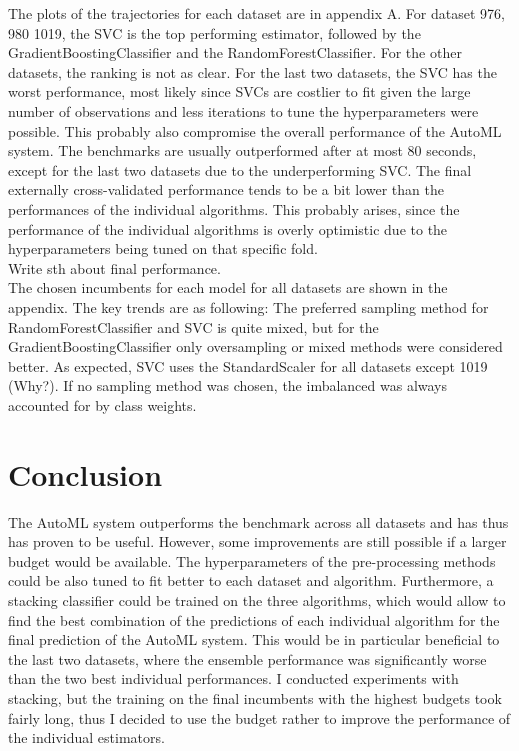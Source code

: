 \documentclass[11pt]{article}
\begin{document}
The plots of the trajectories for each dataset are in appendix A. For dataset 976, 980 1019, the SVC is the top performing estimator, followed by the GradientBoostingClassifier and the RandomForestClassifier. For the other datasets, the ranking is not as clear. For the last two datasets, the SVC has the worst performance, most likely since SVCs are costlier to fit given the large number of observations and less iterations to tune the hyperparameters were possible. This probably also compromise the overall performance of the AutoML system. The benchmarks are usually outperformed after at most 80 seconds, except for the last two datasets due to the underperforming SVC. The final externally cross-validated performance tends to be a bit lower than the performances of the individual algorithms. This probably arises, since the performance of the individual algorithms is overly optimistic due to the hyperparameters being tuned on that specific fold. \\

Write sth about final performance. \\

The chosen incumbents for each model for all datasets are shown in the appendix. The key trends are as following: The preferred sampling method for RandomForestClassifier and SVC is quite mixed, but for the GradientBoostingClassifier only oversampling or mixed methods were considered better. As expected, SVC uses the StandardScaler for all datasets except 1019 (Why?). If no sampling method was chosen, the imbalanced was always accounted for by class weights. \\

\section{Conclusion}

The AutoML system outperforms the benchmark across all datasets and has thus has proven to be useful. However, some improvements are still possible if a larger budget would be available. The hyperparameters of the pre-processing methods could be also tuned to fit better to each dataset and algorithm. Furthermore, a stacking classifier could be trained on the three algorithms, which would allow to find the best combination of the predictions of each individual algorithm for the final prediction of the AutoML system. This would be in particular beneficial to the last two datasets, where the ensemble performance was significantly worse than the two best individual performances. I conducted experiments with stacking, but the training on the final incumbents with the highest budgets took fairly long, thus I decided to use the budget rather to improve the performance of the individual estimators.
\end{document}
